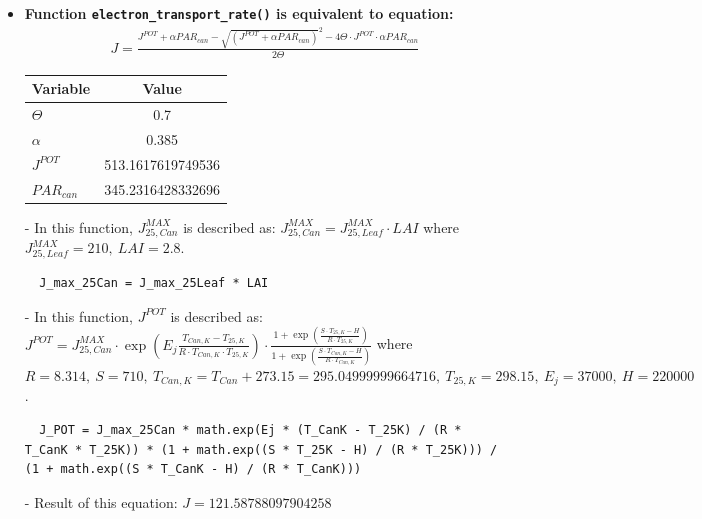 \documentclass[a4paper]{article}
\numberwithin{equation}{section}
\begin{document}
\begin{itemize}
  \item \textbf{Function \texttt{electron\_transport\_rate()} is equivalent to equation:}
        \begin{align*}
          J = \frac{J^{POT} + \alpha PAR_{can} - {\sqrt{(J^{POT} + \alpha PAR_{can})}^2 - 4\Theta\cdot J^{POT}\cdot \alpha PAR_{can}}}{2 \Theta}
        \end{align*}

        \begin{table}[H]
          \centering
          \begin{tabular}{@{}lS[table-format=3.13]@{}}
            \toprule
            \textbf{Variable} & \textbf{Value}    \\
            \midrule
            \( \Theta \)        & 0.7               \\
            \( \alpha \)        & 0.385             \\
            \( J^{POT} \)       & 513.1617619749536 \\
            \( PAR_{can} \)     & 345.2316428332696 \\
            \bottomrule
          \end{tabular}
        \end{table}

  \item[-] In this function, \( J^{MAX}_{25,Can} \) is described as: \( J^{MAX}_{25,Can} = J^{MAX}_{25,Leaf} \cdot LAI \) where \( J^{MAX}_{25,Leaf} = 210,\ LAI = 2.8 \).
        \begin{mdframed}[leftline=false,rightline=false,backgroundcolor=magenta!10,nobreak=true]
          \begin{verbatim}
  J_max_25Can = J_max_25Leaf * LAI
          \end{verbatim}
        \end{mdframed}
  \item[-] In this function, \( J^{POT} \) is described as: \( J^{POT} = J^{MAX}_{25,Can} \cdot \exp \left(E_j\frac{T_{Can,K}-T_{25,K}}{R\cdot T_{Can,K}\cdot T_{25,K}}\right) \cdot \frac{1 + \exp \left(\frac{S\cdot T_{25,K}-H}{R\cdot T_{25,K}}\right)}{1 + \exp \left(\frac{S\cdot T_{Can,K}-H}{R\cdot T_{Can,K}}\right)} \) where \( R = 8.314,\ S = 710,\ T_{Can,K} = T_{Can} + 273.15 = 295.04999999664716,\ T_{25,K} = 298.15,\ E_j = 37000,\ H = 220000 \).
        \begin{mdframed}[leftline=false,rightline=false,backgroundcolor=magenta!10,nobreak=true]
          \begin{verbatim}
  J_POT = J_max_25Can * math.exp(Ej * (T_CanK - T_25K) / (R * T_CanK * T_25K)) * (1 + math.exp((S * T_25K - H) / (R * T_25K))) / (1 + math.exp((S * T_CanK - H) / (R * T_CanK)))
          \end{verbatim}
        \end{mdframed}
  \item[-] Result of this equation: \( J = 121.58788097904258 \)


\end{itemize}
\end{document}
